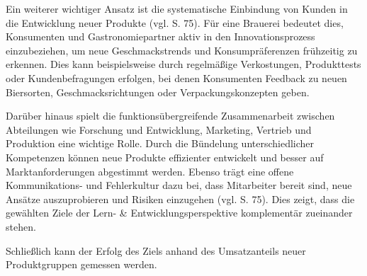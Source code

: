 Ein weiterer wichtiger Ansatz ist die systematische Einbindung von Kunden in die Entwicklung neuer Produkte (vgl. \cite{kollinger_intrapreneurship_2023} S. 75). Für eine Brauerei bedeutet dies, Konsumenten und Gastronomiepartner aktiv in den Innovationsprozess einzubeziehen, um neue Geschmackstrends und Konsumpräferenzen frühzeitig zu erkennen. Dies kann beispielsweise durch regelmäßige Verkostungen, Produkttests oder Kundenbefragungen erfolgen, bei denen Konsumenten Feedback zu neuen Biersorten, Geschmacksrichtungen oder Verpackungskonzepten geben.

Darüber hinaus spielt die funktionsübergreifende Zusammenarbeit zwischen Abteilungen wie Forschung und Entwicklung, Marketing, Vertrieb und Produktion eine wichtige Rolle. Durch die Bündelung unterschiedlicher Kompetenzen können neue Produkte effizienter entwickelt und besser auf Marktanforderungen abgestimmt werden. Ebenso trägt eine offene Kommunikations- und Fehlerkultur dazu bei, dass Mitarbeiter bereit sind, neue Ansätze auszuprobieren und Risiken einzugehen (vgl. \cite{kollinger_intrapreneurship_2023} S. 75). Dies zeigt, dass die gewählten Ziele der Lern- \& Entwicklungsperspektive komplementär zueinander stehen.

Schließlich kann der Erfolg des Ziels anhand des Umsatzanteils neuer Produktgruppen gemessen werden.








